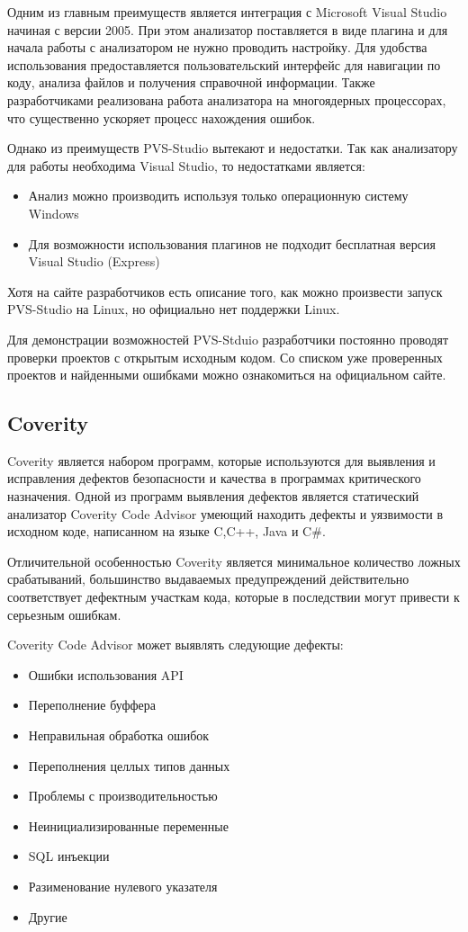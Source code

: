 Одним из главным преимуществ является интеграция с Microsoft Visual Studio начиная с версии 2005.
При этом анализатор поставляется в виде плагина и для начала работы с анализатором не нужно
проводить настройку. Для удобства использования предоставляется пользовательский интерфейс для 
навигации по коду, анализа файлов и получения справочной информации. Также разработчиками реализована 
работа анализатора на многоядерных процессорах, что существенно ускоряет процесс нахождения ошибок.

Однако из преимуществ PVS-Studio вытекают и недостатки. Так как анализатору для работы необходима  
Visual Studio, то недостатками является:
\begin{itemize}
 \item Анализ можно производить используя только операционную систему Windows
 \item Для возможности использования плагинов не подходит бесплатная версия Visual Studio (Express)     
\end{itemize}

Хотя на сайте разработчиков есть описание того, как можно произвести запуск PVS-Studio на Linux, 
но официально нет поддержки Linux.

Для демонстрации возможностей PVS-Stduio разработчики постоянно проводят проверки проектов
с открытым исходным кодом. Со списком уже проверенных проектов и найденными ошибками можно 
ознакомиться на официальном сайте\cite{pvsopen}.

\subsection{Coverity}
Coverity является набором программ, которые используются для выявления и исправления дефектов безопасности
и качества в программах критического назначения. Одной из программ выявления дефектов является
статический анализатор Coverity Code Advisor умеющий находить дефекты и уязвимости в исходном коде, 
написанном на языке C,C++, Java и C\#.  

Отличительной особенностью Coverity является минимальное количество ложных срабатываний, большинство 
выдаваемых предупреждений действительно соответствует дефектным участкам кода, которые в последствии могут
привести к серьезным ошибкам.

Coverity Code Advisor может выявлять следующие дефекты:
\begin{itemize}
	\item Ошибки использования API
	\item Переполнение буффера
	\item Неправильная обработка ошибок
	\item Переполнения целлых типов данных
	\item Проблемы с производительностью
	\item Неинициализированные переменные
	\item SQL инъекции
	\item Разименование нулевого указателя
	\item Другие\cite{covall}
\end{itemize}
 
